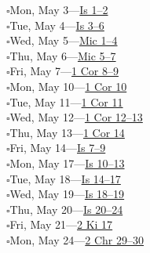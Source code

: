 \hypertarget{rp-2027-05-03}{}\noindent$\square$\enspace Mon, May 3\enspace---\enspace \hyperlink{ch-isaiah-1}{Is 1--2}\\
\hypertarget{rp-2027-05-04}{}\noindent$\square$\enspace Tue, May 4\enspace---\enspace \hyperlink{ch-isaiah-3}{Is 3--6}\\
\hypertarget{rp-2027-05-05}{}\noindent$\square$\enspace Wed, May 5\enspace---\enspace \hyperlink{ch-micah-1}{Mic 1--4}\\
\hypertarget{rp-2027-05-06}{}\noindent$\square$\enspace Thu, May 6\enspace---\enspace \hyperlink{ch-micah-5}{Mic 5--7}\\
\hypertarget{rp-2027-05-07}{}\noindent$\square$\enspace Fri, May 7\enspace---\enspace \hyperlink{ch-1corinthians-8}{1 Cor 8--9}\\
\hypertarget{rp-2027-05-10}{}\noindent$\square$\enspace Mon, May 10\enspace---\enspace \hyperlink{ch-1corinthians-10}{1 Cor 10}\\
\hypertarget{rp-2027-05-11}{}\noindent$\square$\enspace Tue, May 11\enspace---\enspace \hyperlink{ch-1corinthians-11}{1 Cor 11}\\
\hypertarget{rp-2027-05-12}{}\noindent$\square$\enspace Wed, May 12\enspace---\enspace \hyperlink{ch-1corinthians-12}{1 Cor 12--13}\\
\hypertarget{rp-2027-05-13}{}\noindent$\square$\enspace Thu, May 13\enspace---\enspace \hyperlink{ch-1corinthians-14}{1 Cor 14}\\
\hypertarget{rp-2027-05-14}{}\noindent$\square$\enspace Fri, May 14\enspace---\enspace \hyperlink{ch-isaiah-7}{Is 7--9}\\
\hypertarget{rp-2027-05-17}{}\noindent$\square$\enspace Mon, May 17\enspace---\enspace \hyperlink{ch-isaiah-10}{Is 10--13}\\
\hypertarget{rp-2027-05-18}{}\noindent$\square$\enspace Tue, May 18\enspace---\enspace \hyperlink{ch-isaiah-14}{Is 14--17}\\
\hypertarget{rp-2027-05-19}{}\noindent$\square$\enspace Wed, May 19\enspace---\enspace \hyperlink{ch-isaiah-18}{Is 18--19}\\
\hypertarget{rp-2027-05-20}{}\noindent$\square$\enspace Thu, May 20\enspace---\enspace \hyperlink{ch-isaiah-20}{Is 20--24}\\
\hypertarget{rp-2027-05-21}{}\noindent$\square$\enspace Fri, May 21\enspace---\enspace \hyperlink{ch-2kings-17}{2 Ki 17}\\
\hypertarget{rp-2027-05-24}{}\noindent$\square$\enspace Mon, May 24\enspace---\enspace \hyperlink{ch-2chronicles-29}{2 Chr 29--30}\\
